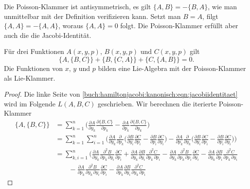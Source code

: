 Die Poisson-Klammer ist antisymmetrisch, es gilt $\{A,B\} = -\{B,A\}$,
wie man unmittelbar mit der Definition verifizieren kann.
Setzt man $B=A$, filgt $\{A,A\}=-\{A,A\}$, woraus $\{A,A\}=0$ folgt.
Die Poisson-Klammer erfüllt aber auch die die Jacobi-Identität.

\begin{satz}
Für drei Funktionen $A(x,y,p)$, $B(x,y,p)$ und $C(x,y,p)$ gilt
\begin{equation}
\{A,\{B,C\}\}
+
\{B,\{C,A\}\}
+
\{C,\{A,B\}\}
=
0.
\label{buch:hamiltonjacobi:kanonisch:eqn:jacobiidentitaet}
\end{equation}
Die Funktionen von $x$, $y$ und $p$ bilden eine Lie-Algebra mit
der Poisson-Klammer als Lie-Klammer.
\end{satz}

\begin{proof}
Die linke Seite von
\eqref{buch:hamiltonjacobi:kanonisch:eqn:jacobiidentitaet}
wird im Folgende $L(A,B,C)$ geschrieben.
Wir berechnen die iterierte Poisson-Klammer
\begin{align*}
\{A,\{B,C\}\}
&=
\sum_{k=1}^n
\biggl(
\frac{\partial A}{\partial y_k} 
\frac{\partial \{B,C\}}{\partial p_k}
-
\frac{\partial A}{\partial p_k} 
\frac{\partial \{B,C\}}{\partial y_k}
\biggr)
\\
&=
\sum_{k=1}^n\sum_{i=1}^n
\biggl(
\frac{\partial A}{\partial y_k}
\frac{\partial}{\partial p_k}\biggl(
\frac{\partial B}{\partial y_i}
\frac{\partial C}{\partial p_i}
-
\frac{\partial B}{\partial p_i}
\frac{\partial C}{\partial y_i}
\biggr)
-
\frac{\partial A}{\partial p_k}
\frac{\partial}{\partial y_k}\biggl(
\frac{\partial B}{\partial y_i}
\frac{\partial C}{\partial p_i}
-
\frac{\partial B}{\partial p_i}
\frac{\partial C}{\partial y_i}
\biggr)
\biggr)
\\
&=
\sum_{k,i=1}^n
\bigg(
\frac{\partial A}{\partial y_k}
\frac{\partial^2 B}{\partial p_k\,\partial y_i}
\frac{\partial C}{\partial p_i}
+
\frac{\partial A}{\partial y_k}
\frac{\partial B}{\partial y_i}
\frac{\partial^2 C}{\partial p_k\,\partial p_i}
-
\frac{\partial A}{\partial y_k}
\frac{\partial^2 B}{\partial p_k\,\partial p_i}
\frac{\partial C}{\partial y_i}
-
\frac{\partial A}{\partial y_k}
\frac{\partial B}{\partial p_i}
\frac{\partial^2 C}{\partial p_k\,\partial y_i}
\\
&\qquad
-
\frac{\partial A}{\partial p_k}
\frac{\partial^2 B}{\partial y_k\,\partial y_i}
\frac{\partial C}{\partial p_i}
-
\frac{\partial A}{\partial p_k}
\frac{\partial B}{\partial y_i}
\frac{\partial^2 C}{\partial y_k\,\partial p_i}

\end{align*}
\end{proof}
